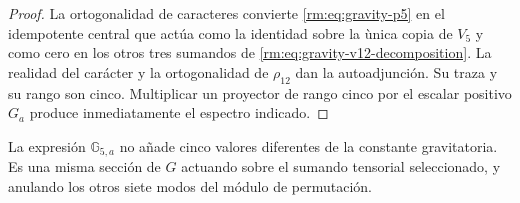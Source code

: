 \begin{proof}
La ortogonalidad de caracteres convierte \cref{rm:eq:gravity-p5} en el
idempotente central que act\'ua como la identidad sobre la \`unica copia de
\(V_5\) y como cero en los otros tres sumandos de
\cref{rm:eq:gravity-v12-decomposition}. La realidad del car\'acter y la
ortogonalidad de \(\rho_{12}\) dan la autoadjunci\'on. Su traza y su rango
son cinco. Multiplicar un proyector de rango cinco por el escalar positivo
\(G_a\) produce inmediatamente el espectro indicado.
\end{proof}

La expresi\'on \(\mathbb G_{5,a}\) no a\~nade cinco valores diferentes de
la constante gravitatoria. Es una misma secci\'on de \(G\) actuando sobre
el sumando tensorial seleccionado, y anulando los otros siete modos del
m\'odulo de permutaci\'on.
